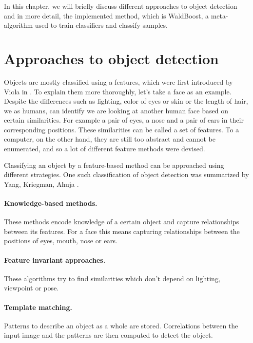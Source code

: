 In this chapter, we will briefly discuss different approaches to object detection and in more detail, the implemented method, which is WaldBoost, a meta-algorithm used to train classifiers and classify samples.

\section{Approaches to object detection} \label{sec:approaches}

Objects are mostly classified using a features, which were first introduced by Viola in \cite{Viola93feature-basedrecognition}. To explain them more thoroughly, let's take a face as an example. Despite the differences such as lighting, color of eyes or skin or the length of hair, we as humans, can identify we are looking at another human face based on certain similarities. For example a pair of eyes, a nose and a pair of ears in their corresponding positions. These similarities can be called a set of features. To a computer, on the other hand, they are still too abstract and cannot be enumerated, and so a lot of different feature methods were devised.

Classifying an object by a feature-based method can be approached using different strategies. One such classification of object detection was summarized by Yang, Kriegman, Ahuja \cite{Yang02detectingfaces}.

\paragraph{Knowledge-based methods.} These methods encode knowledge of a certain object and capture relationships between its features. For a face this means capturing relationships between the positions of eyes, mouth, nose or ears.

\paragraph{Feature invariant approaches.} These algorithms try to find similarities which don't depend on lighting, viewpoint or pose. 

\paragraph{Template matching.} Patterns to describe an object as a whole are stored. Correlations between the input image and the patterns are then computed to detect the object.

